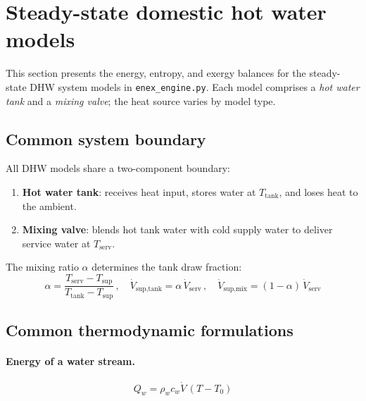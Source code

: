 \section{Steady-state domestic hot water models}
\label{sec:enex-engine}

This section presents the energy, entropy, and exergy balances for the steady-state DHW system models in \texttt{enex\_engine.py}. Each model comprises a \emph{hot water tank} and a \emph{mixing valve}; the heat source varies by model type.

\subsection{Common system boundary}
\label{sec:dhw-common}

All DHW models share a two-component boundary:
\begin{enumerate}
  \item \textbf{Hot water tank}: receives heat input, stores water at $T_\text{tank}$, and loses heat to the ambient.
  \item \textbf{Mixing valve}: blends hot tank water with cold supply water to deliver service water at $T_\text{serv}$.
\end{enumerate}

The mixing ratio $\alpha$ determines the tank draw fraction:
\begin{equation}\label{eq:dhw-alpha}
  \alpha = \frac{T_\text{serv} - T_\text{sup}}{T_\text{tank} - T_\text{sup}}
  \,,\quad
  \dot{V}_\text{sup,tank} = \alpha\,\dot{V}_\text{serv}
  \,,\quad
  \dot{V}_\text{sup,mix} = (1 - \alpha)\,\dot{V}_\text{serv}
\end{equation}

\subsection{Common thermodynamic formulations}

\paragraph{Energy of a water stream.}
\begin{equation}\label{eq:dhw-Q}
  Q_w = \rho_w c_w \dot{V}\,(T - T_0)
\end{equation}

